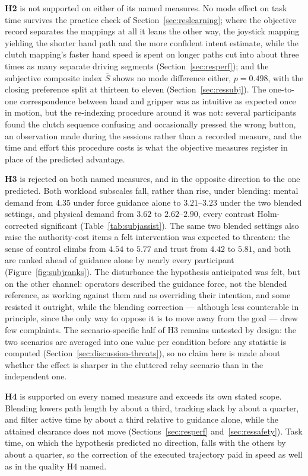 \documentclass[12pt,a4paper,twoside,openright]{report}
\begin{document}
\textbf{H2} is not supported on either of its named measures. No mode effect on task time survives the practice check of Section~\ref{sec:reslearning}; where the objective record separates the mappings at all it leans the other way, the joystick mapping yielding the shorter hand path and the more confident intent estimate, while the clutch mapping's faster hand speed is spent on longer paths cut into about three times as many separate driving segments (Section~\ref{sec:resperf}); and the subjective composite index $\bar{S}$ shows no mode difference either, $p=0.498$, with the closing preference split at thirteen to eleven (Section~\ref{sec:ressubj}). The one-to-one correspondence between hand and gripper was as intuitive as expected once in motion, but the re-indexing procedure around it was not: several participants found the clutch sequence confusing and occasionally pressed the wrong button, an observation made during the sessions rather than a recorded measure, and the time and effort this procedure costs is what the objective measures register in place of the predicted advantage.

\textbf{H3} is rejected on both named measures, and in the opposite direction to the one predicted. Both workload subscales fall, rather than rise, under blending: mental demand from $4.35$ under force guidance alone to $3.21$--$3.23$ under the two blended settings, and physical demand from $3.62$ to $2.62$--$2.90$, every contrast Holm-corrected significant (Table~\ref{tab:subjassist}). The same two blended settings also raise the authority-cost items a felt intervention was expected to threaten: the sense of control climbs from $4.54$ to $5.77$ and trust from $4.42$ to $5.81$, and both are ranked ahead of guidance alone by nearly every participant (Figure~\ref{fig:subjranks}). The disturbance the hypothesis anticipated was felt, but on the other channel: operators described the guidance force, not the blended reference, as working against them and as overriding their intention, and some resisted it outright, while the blending correction --- although less counterable in principle, since the only way to oppose it is to move away from the goal --- drew few complaints. The scenario-specific half of H3 remains untested by design: the two scenarios are averaged into one value per condition before any statistic is computed (Section~\ref{sec:discussion-threats}), so no claim here is made about whether the effect is sharper in the cluttered relay scenario than in the independent one.

\textbf{H4} is supported on every named measure and exceeds its own stated scope. Blending lowers path length by about a third, tracking slack by about a quarter, and filter active time by about a third relative to guidance alone, while the attained clearance does not move (Sections~\ref{sec:resperf} and~\ref{sec:ressafety}). Task time, on which the hypothesis predicted no direction, falls with the others by about a quarter, so the correction of the executed trajectory paid in speed as well as in the quality H4 named.
\end{document}
